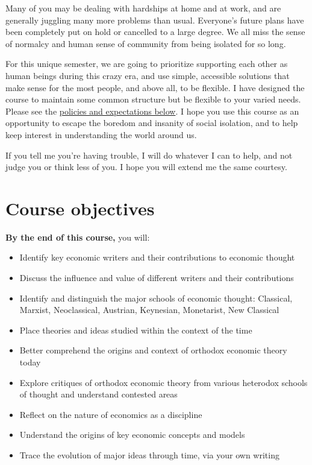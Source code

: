\documentclass{article}
\providecommand{\tightlist}{%
  \setlength{\itemsep}{0pt}\setlength{\parskip}{0pt}}
\begin{document}
Many of you may be dealing with hardships at home and at work, and are
generally juggling many more problems than usual. Everyone's future
plans have been completely put on hold or cancelled to a large degree.
We all miss the sense of normalcy and human sense of community from
being isolated for so long.

For this unique semester, we are going to prioritize supporting each
other as human beings during this crazy era, and use simple, accessible
solutions that make sense for the most people, and above all, to be
flexible. I have designed the course to maintain some common structure
but be flexible to your varied needs. Please see the
\protect\hyperlink{policies-and-expectations}{policies and expectations
below}. I hope you use this course as an opportunity to escape the
boredom and insanity of social isolation, and to help keep interest in
understanding the world around us.

If you tell me you're having trouble, I will do whatever I can to help,
and not judge you or think less of you. I hope you will extend me the
same courtesy.

\hypertarget{course-objectives}{%
\section*{Course objectives}\label{course-objectives}}

\textbf{By the end of this course,} you will:

\begin{itemize}
\tightlist
\item
  Identify key economic writers and their contributions to economic
  thought
\item
  Discuss the influence and value of different writers and their
  contributions
\item
  Identify and distinguish the major schools of economic thought:
  Classical, Marxist, Neoclassical, Austrian, Keynesian, Monetarist, New
  Classical
\item
  Place theories and ideas studied within the context of the time
\item
  Better comprehend the origins and context of orthodox economic theory
  today
\item
  Explore critiques of orthodox economic theory from various heterodox
  schools of thought and understand contested areas
\item
  Reflect on the nature of economics as a discipline
\item
  Understand the origins of key economic concepts and models
\item
  Trace the evolution of major ideas through time, via your own writing
\end{itemize}
\end{document}
